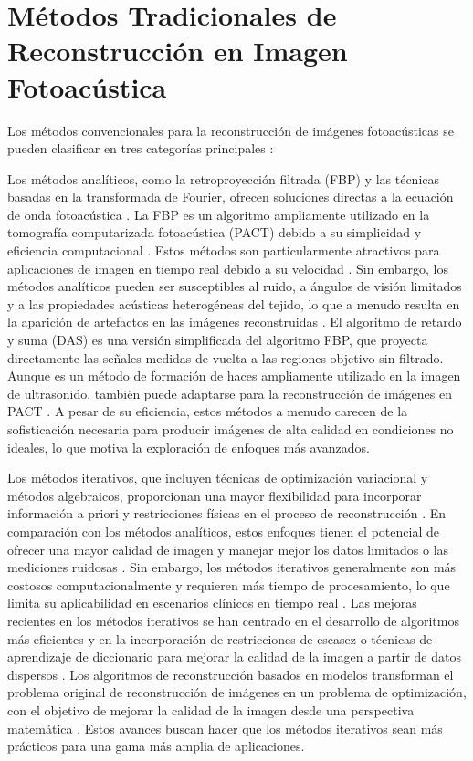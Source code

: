 \section{Métodos Tradicionales de Reconstrucción en Imagen Fotoacústica}

Los métodos convencionales para la reconstrucción de imágenes fotoacústicas se pueden clasificar en tres categorías principales \cite{recent_advances_2025a}:

Los métodos analíticos, como la retroproyección filtrada (FBP) y las técnicas basadas en la transformada de Fourier, ofrecen soluciones directas a la ecuación de onda fotoacústica \cite{recent_advances_2025a}. La FBP es un algoritmo ampliamente utilizado en la tomografía computarizada fotoacústica (PACT) debido a su simplicidad y eficiencia computacional \cite{image_reconstruction_pa_2024}. Estos métodos son particularmente atractivos para aplicaciones de imagen en tiempo real debido a su velocidad \cite{recent_advances_2025a}. Sin embargo, los métodos analíticos pueden ser susceptibles al ruido, a ángulos de visión limitados y a las propiedades acústicas heterogéneas del tejido, lo que a menudo resulta en la aparición de artefactos en las imágenes reconstruidas \cite{recent_advances_2025a}. El algoritmo de retardo y suma (DAS) es una versión simplificada del algoritmo FBP, que proyecta directamente las señales medidas de vuelta a las regiones objetivo sin filtrado. Aunque es un método de formación de haces ampliamente utilizado en la imagen de ultrasonido, también puede adaptarse para la reconstrucción de imágenes en PACT \cite{deep_learning_realtime_2021}. A pesar de su eficiencia, estos métodos a menudo carecen de la sofisticación necesaria para producir imágenes de alta calidad en condiciones no ideales, lo que motiva la exploración de enfoques más avanzados.

Los métodos iterativos, que incluyen técnicas de optimización variacional y métodos algebraicos, proporcionan una mayor flexibilidad para incorporar información a priori y restricciones físicas en el proceso de reconstrucción \cite{recent_advances_2025a}. En comparación con los métodos analíticos, estos enfoques tienen el potencial de ofrecer una mayor calidad de imagen y manejar mejor los datos limitados o las mediciones ruidosas \cite{recent_advances_2025a}. Sin embargo, los métodos iterativos generalmente son más costosos computacionalmente y requieren más tiempo de procesamiento, lo que limita su aplicabilidad en escenarios clínicos en tiempo real \cite{recent_advances_2025a}. Las mejoras recientes en los métodos iterativos se han centrado en el desarrollo de algoritmos más eficientes y en la incorporación de restricciones de escasez o técnicas de aprendizaje de diccionario para mejorar la calidad de la imagen a partir de datos dispersos \cite{sparse_sampling_2024}. Los algoritmos de reconstrucción basados en modelos transforman el problema original de reconstrucción de imágenes en un problema de optimización, con el objetivo de mejorar la calidad de la imagen desde una perspectiva matemática \cite{sparse_sampling_2024}. Estos avances buscan hacer que los métodos iterativos sean más prácticos para una gama más amplia de aplicaciones.

